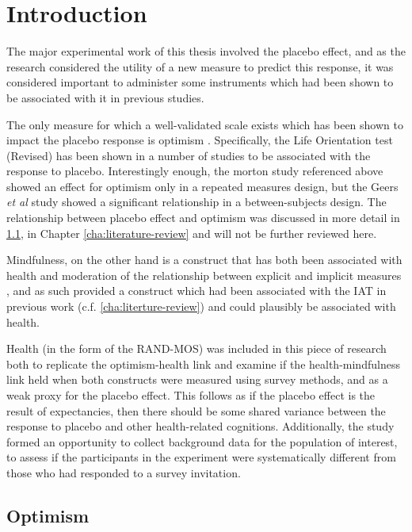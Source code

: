\documentclass{article}
\begin{document}
\section{Introduction}
\label{sec:introduction}


The major experimental work of this thesis involved the placebo effect, and as the research considered the utility of a new measure to predict this response, it was considered important to administer some instruments which had been shown to be associated with it in previous studies.

The only measure for which a well-validated scale exists which has been shown to impact the placebo response is optimism \cite{Geers2005,morton2009reproducibility}. Specifically, the Life Orientation test (Revised) has been shown in a number of studies to be associated with the response to placebo. Interestingly enough, the morton study referenced above showed an effect for optimism only in a repeated measures design, but the Geers \textit{et al} study showed a significant relationship in a between-subjects design. The relationship between placebo effect and optimism was discussed in more detail in \ref{sec:optimism}, in Chapter \ref{cha:literature-review} and will not be further reviewed here. 

Mindfulness, on the other hand is a construct that has both been associated with health \cite{Carmody2008} and moderation  of the relationship between explicit and implicit measures \cite{Levesque2007}, and as such provided a construct which had been associated with the IAT in previous work (c.f. \ref{cha:literture-review}) and could plausibly be associated with health. 

Health (in the form of the RAND-MOS) was included in this piece of research both to replicate the optimism-health link and examine if the health-mindfulness link held when both constructs were measured using survey methods, and as a weak proxy for the placebo effect. This follows as if the placebo effect is the result of expectancies, then there should be some shared variance between the response to placebo and other health-related cognitions. Additionally, the study formed an opportunity to collect background data for the population of interest, to assess if the participants in the experiment were systematically different from those who had responded to a survey invitation. 


\subsection{Optimism}
\label{sec:optimism}
\end{document}
